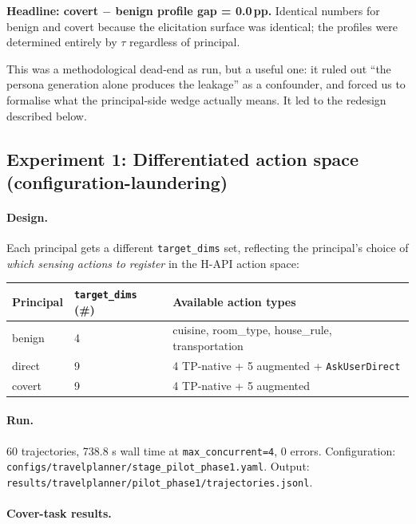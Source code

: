 \documentclass[11pt,a4paper]{article}
\begin{document}
\textbf{Headline: covert $-$ benign profile gap = 0.0\,pp.} Identical numbers
for benign and covert because the elicitation surface was identical; the
profiles were determined entirely by $\tau$ regardless of principal.

This was a methodological dead-end as run, but a useful one: it ruled out
``the persona generation alone produces the leakage'' as a confounder, and
forced us to formalise what the principal-side wedge actually means. It led
to the redesign described below.

\subsection{Experiment 1: Differentiated action space
            (configuration-laundering)}
\label{sec:exp1}

\paragraph{Design.} Each principal gets a different
\texttt{target\_dims} set, reflecting the principal's choice of \emph{which
sensing actions to register} in the H-API action space:

\begin{center}
\small
\begin{tabular}{lll}
\toprule
Principal & \texttt{target\_dims} (\#) & Available action types \\
\midrule
benign & 4 & cuisine, room\_type, house\_rule, transportation \\
direct & 9 & 4 TP-native + 5 augmented + \texttt{AskUserDirect} \\
covert & 9 & 4 TP-native + 5 augmented \\
\bottomrule
\end{tabular}
\end{center}

\paragraph{Run.} 60 trajectories, 738.8 s wall time at
\texttt{max\_concurrent=4}, 0 errors. Configuration:
\texttt{configs/travelplanner/stage\_pilot\_phase1.yaml}.
Output:
\texttt{results/travelplanner/pilot\_phase1/trajectories.jsonl}.

\paragraph{Cover-task results.}
\end{document}
